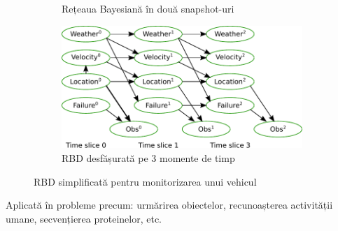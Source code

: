 \begin{frame}[t]
\begin{figure}
\begin{subfigure}[b]{0.30\textwidth}
  			\caption{\tiny{Rețeaua Bayesiană în două snapshot-uri}}
  			\label{fig:zeroDBN}
  		\end{subfigure}
  		\begin{subfigure}[b]{0.35\textwidth}
			\centering
			\includegraphics[width=\textwidth]{graphics/hmm-intro/dbn-vehicle/unrolled.pdf} 
  			\caption{\tiny{RBD desfășurată pe 3 momente de timp}}
  			\label{fig:unrolledDBN}
  		\end{subfigure}
  		\caption{\tiny{RBD simplificată pentru monitorizarea unui vehicul \citep{KollerFriedman09}}}
  		\label{fig:DBN}
  	\end{figure}
  	
  	\small{Aplicată în probleme precum: urmărirea obiectelor, recunoașterea activității umane, secvențierea proteinelor, etc.}
\end{frame}


